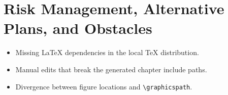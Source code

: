 \section{Risk Management, Alternative Plans, and Obstacles}
\label{sec:risk-management-alternative-plans-and-obstacles}

\begin{tcolorbox}[colback=red!3, colframe=fibred, title=Representative risks]
\begin{itemize}
  \item Missing LaTeX dependencies in the local TeX distribution.
  \item Manual edits that break the generated chapter include paths.
  \item Divergence between figure locations and \texttt{\textbackslash graphicspath}.
\end{itemize}
\end{tcolorbox}
